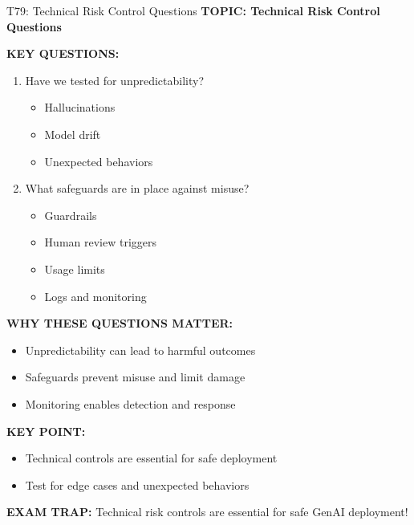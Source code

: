\documentclass[8pt]{beamer}
\begin{document}
	\begin{frame}{T79: Technical Risk Control Questions}
		\fontsize{6.5}{7.5}\selectfont
		\textbf{TOPIC: Technical Risk Control Questions}
		
		\vspace{0.1cm}
		\textbf{KEY QUESTIONS:}
		\begin{enumerate}
			\item \textcolor{myblue}{Have we tested for unpredictability?}
			\begin{itemize}
				\item Hallucinations
				\item Model drift
				\item Unexpected behaviors
			\end{itemize}
			\item \textcolor{myblue}{What safeguards are in place against misuse?}
			\begin{itemize}
				\item Guardrails
				\item Human review triggers
				\item Usage limits
				\item Logs and monitoring
			\end{itemize}
		\end{enumerate}
		
		\vspace{0.1cm}
		\textbf{WHY THESE QUESTIONS MATTER:}
		\begin{itemize}
			\item Unpredictability can lead to harmful outcomes
			\item Safeguards prevent misuse and limit damage
			\item Monitoring enables detection and response
		\end{itemize}
		
		\vspace{0.1cm}
		\textbf{KEY POINT:}
		\begin{itemize}
			\item Technical controls are essential for safe deployment
			\item Test for edge cases and unexpected behaviors
		\end{itemize}
		
		\textcolor{myred}{\textbf{EXAM TRAP:}} Technical risk controls are \textcolor{myblue}{essential for safe GenAI deployment}!
	\end{frame}
	
\end{document}
